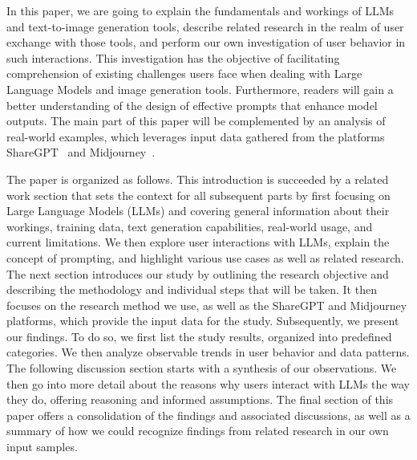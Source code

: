 In this paper, we are going to explain the fundamentals and workings of LLMs and text-to-image
generation tools,
describe related research in the realm of user exchange with those tools, and perform our own
investigation of user behavior in such interactions.
This investigation has the objective of facilitating comprehension of existing challenges users
face when dealing with Large Language Models and image generation tools.
Furthermore, readers will gain a better understanding of the design of effective prompts that
enhance model outputs.
The main part of this paper will be complemented by an analysis of real-world examples, which
leverages input data gathered from the platforms ShareGPT~\cite{sharegpt_sharegpt_2023} and
Midjourney~\cite{midjourney_midjourney_2023}.

The paper is organized as follows.
This introduction is succeeded by a related work section that sets the context for all subsequent
parts by first focusing on Large Language Models (LLMs) and covering general information about
their workings, training data, text generation capabilities, real-world usage, and current limitations.
We then explore user interactions with LLMs, explain the concept of prompting, and highlight
various use cases as well as related research.
%
The next section introduces our study by outlining the research objective and
describing the methodology and individual steps that will be taken.
It then focuses on the research method we use, as well as the ShareGPT and Midjourney platforms,
which provide the input data for the study.
%
Subsequently, we present our findings.
To do so, we first list the study results, organized into predefined categories.
We then analyze observable trends in user behavior and data patterns.
%
The following discussion section starts with a synthesis of our observations.
We then go into more detail about the reasons why users interact with LLMs the way they do,
offering reasoning and informed assumptions.
%
The final section of this paper offers a consolidation of the findings and associated discussions,
as well as a summary of how we could recognize findings from related research in our own input
samples.